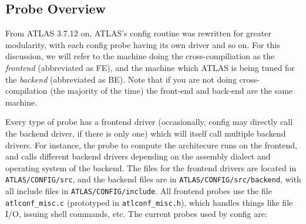 \documentclass[11pt]{article}
\newcommand{\Wskip}[1]{ }
\begin{document}
\Wskip{
\subsection{Weaknesses in {\tt spew}/{\tt config}}
\begin{enumerate}
\item Needs a flag for the {\tt delay} variable
\item Needs correct lib setup:
   \begin{itemize}
   \item Spew \& config flags for BLASlib, FBLASlib, FLAPACKlib, extra syslibs.
   \item config.c needs an updated GetSysLib, output passed to spew 
         via extra syslibs.
   \item Need flags for archiver, archflags, and ranlib 
         (also table lookup in config.c)
   \end{itemize}
\end{enumerate}
}

\subsection{Probe Overview}
From ATLAS 3.7.12 on, ATLAS's config routine was rewritten for greater
modularity, with each config probe having its own driver and so on.
For this discussion, we will refer to the machine doing the cross-compiliation
as the {\it frontend} (abbreviated as FE), and the machine which ATLAS is
being tuned for the {\it backend} (abbreviated as BE).  Note that if you are
not doing cross-compilation (the majority of the time) the front-end and
back-end are the same machine.

Every type of probe has a frontend driver (occasionally, config may directly
call the backend driver, if there is only one) which will itself call
multiple backend drivers.  
For instance, the probe to compute the architecure runs on the frontend, and
calls different backend drivers depending on the assembly dialect and operating
system of the backend.
The files for the frontend drivers are located in
{\tt ATLAS/CONFIG/src}, and the backend files are in 
{\tt ATLAS/CONFIG/src/backend}, with all include files in 
{\tt ATLAS/CONFIG/include}.  All frontend probes use the file 
{\tt atlconf\_misc.c} (prototyped in {\tt atlconf\_misc.h}), 
which handles things like file I/O, issuing shell commands, etc.  
The current probes used by config are:
\end{document}
